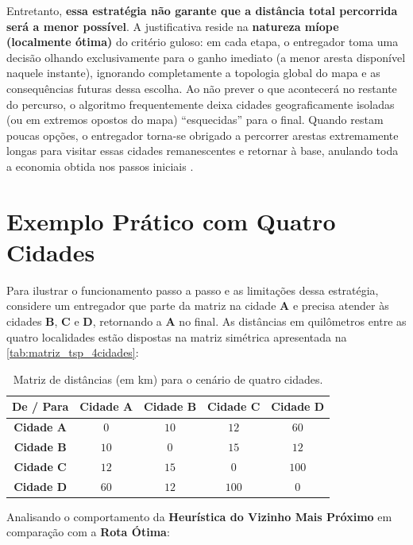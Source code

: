 Entretanto, \textbf{essa estratégia não garante que a distância total percorrida será a menor possível}. A justificativa reside na \textbf{natureza míope (localmente ótima)} do critério guloso: em cada etapa, o entregador toma uma decisão olhando exclusivamente para o ganho imediato (a menor aresta disponível naquele instante), ignorando completamente a topologia global do mapa e as consequências futuras dessa escolha. Ao não prever o que acontecerá no restante do percurso, o algoritmo frequentemente deixa cidades geograficamente isoladas (ou em extremos opostos do mapa) ``esquecidas'' para o final. Quando restam poucas opções, o entregador torna-se obrigado a percorrer arestas extremamente longas para visitar essas cidades remanescentes e retornar à base, anulando toda a economia obtida nos passos iniciais \cite{feofiloff_guloso, techvidvan_greedy}.

\section{Exemplo Prático com Quatro Cidades}

Para ilustrar o funcionamento passo a passo e as limitações dessa estratégia, considere um entregador que parte da matriz na cidade \textbf{A} e precisa atender às cidades \textbf{B}, \textbf{C} e \textbf{D}, retornando a \textbf{A} no final. As distâncias em quilômetros entre as quatro localidades estão dispostas na matriz simétrica apresentada na \autoref{tab:matriz_tsp_4cidades}:

\begin{table}[htb]
\centering
\caption{\label{tab:matriz_tsp_4cidades}Matriz de distâncias (em km) para o cenário de quatro cidades.}
\renewcommand{\arraystretch}{1.2}
\begin{tabular}{|c|c|c|c|c|}
\hline
\rowcolor{gray!20}
\textbf{De / Para} & \textbf{Cidade A} & \textbf{Cidade B} & \textbf{Cidade C} & \textbf{Cidade D} \\ \hline
\textbf{Cidade A} & $0$ & $10$ & $12$ & $60$ \\ \hline
\textbf{Cidade B} & $10$ & $0$ & $15$ & $12$ \\ \hline
\textbf{Cidade C} & $12$ & $15$ & $0$ & $100$ \\ \hline
\textbf{Cidade D} & $60$ & $12$ & $100$ & $0$ \\ \hline
\end{tabular}
\end{table}

Analisando o comportamento da \textbf{Heurística do Vizinho Mais Próximo} em comparação com a \textbf{Rota Ótima}:

